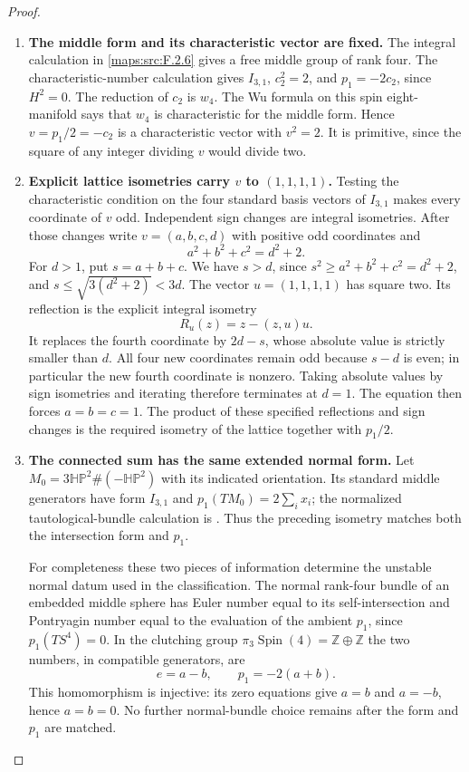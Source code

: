 \begin{proof}
\begin{enumerate}[label=\arabic*.]
\item \textbf{The middle form and its characteristic vector are fixed.}
The integral calculation in \cref{maps:src:F.2.6} gives a free
middle group of rank four.  The characteristic-number calculation
gives $I_{3,1}$, $c_2^2=2$, and $p_1=-2c_2$, since $H^2=0$.
The reduction of $c_2$ is $w_4$.  The Wu formula on this spin
eight-manifold says that $w_4$ is characteristic for the middle
form.  Hence $v=p_1/2=-c_2$ is a characteristic vector with
$v^2=2$.  It is primitive, since the square of any integer
dividing $v$ would divide two.

\item \textbf{Explicit lattice isometries carry $v$ to
$(1,1,1,1)$.}
Testing the characteristic condition on the four standard basis
vectors of $I_{3,1}$ makes every coordinate of $v$ odd.
Independent sign changes are integral isometries.  After those
changes write $v=(a,b,c,d)$ with positive odd coordinates and
\[
a^2+b^2+c^2=d^2+2.
\]
For $d>1$, put $s=a+b+c$.  We have $s>d$, since
$s^2\geq a^2+b^2+c^2=d^2+2$, and
$s\leq\sqrt{3(d^2+2)}<3d$.  The vector
$u=(1,1,1,1)$ has square two.  Its reflection is the explicit
integral isometry
\[
R_u(z)=z-(z,u)u.
\]
It replaces the fourth coordinate by $2d-s$, whose absolute
value is strictly smaller than $d$.  All four new coordinates
remain odd because $s-d$ is even; in particular the new fourth
coordinate is nonzero.  Taking absolute values by sign
isometries and iterating therefore terminates at $d=1$.
The equation then forces $a=b=c=1$.  The product of these
specified reflections and sign changes is the required
isometry of the lattice together with $p_1/2$.

\item \textbf{The connected sum has the same extended normal form.}
Let $M_0=3\mathbb{HP}^2\#(-\mathbb{HP}^2)$ with its indicated
orientation.  Its standard middle generators have form $I_{3,1}$
and $p_1(TM_0)=2\sum_i x_i$; the normalized tautological-bundle
calculation is \cite[Lemma 2.1 and Theorem 2.4, \S2]{ffMandal}.
Thus the preceding isometry matches both the intersection form
and $p_1$.

For completeness these two pieces of information determine the
unstable normal datum used in the classification.  The normal
rank-four bundle of an embedded middle sphere has Euler number
equal to its self-intersection and Pontryagin number equal to
the evaluation of the ambient $p_1$, since $p_1(TS^4)=0$.
In the clutching group
$\pi_3\operatorname{Spin}(4)=\mathbb Z\oplus\mathbb Z$ the two
numbers, in compatible generators, are
\[
e=a-b,\qquad p_1=-2(a+b).
\]
This homomorphism is injective: its zero equations give
$a=b$ and $a=-b$, hence $a=b=0$.  No further normal-bundle
choice remains after the form and $p_1$ are matched.


\end{enumerate}
\end{proof}
